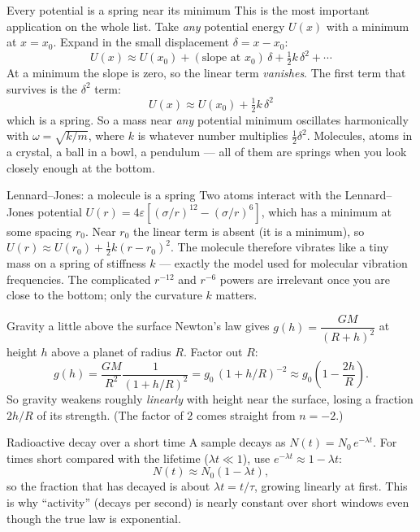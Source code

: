 \documentclass[11pt]{article}
\theoremstyle{mystyle}
\begin{document}
\begin{psidea}{Every potential is a spring near its minimum}{}
This is the most important application on the whole list. Take \emph{any} potential
energy $U(x)$ with a minimum at $x = x_0$. Expand in the small displacement
$\delta = x - x_0$:
\[
U(x) \approx U(x_0) + (\text{slope at } x_0)\,\delta + \tfrac12 k\,\delta^2 + \cdots
\]
At a minimum the slope is zero, so the linear term \emph{vanishes}. The first term that
survives is the $\delta^2$ term:
\[
\boxed{\,U(x) \approx U(x_0) + \tfrac12 k\,\delta^2\,}
\]
which is a spring. So a mass near \emph{any} potential minimum oscillates harmonically
with $\omega = \sqrt{k/m}$, where $k$ is whatever number multiplies $\tfrac12\delta^2$.
Molecules, atoms in a crystal, a ball in a bowl, a pendulum --- all of them are springs
when you look closely enough at the bottom.
\end{psidea}

\begin{psexample}{Lennard--Jones: a molecule is a spring}{}
Two atoms interact with the Lennard--Jones potential
$U(r) = 4\varepsilon\!\left[(\sigma/r)^{12} - (\sigma/r)^{6}\right]$, which has a minimum
at some spacing $r_0$. Near $r_0$ the linear term is absent (it is a minimum), so
$U(r) \approx U(r_0) + \tfrac12 k(r-r_0)^2$. The molecule therefore vibrates like a tiny
mass on a spring of stiffness $k$ --- exactly the model used for molecular vibration
frequencies. The complicated $r^{-12}$ and $r^{-6}$ powers are irrelevant once you are
close to the bottom; only the curvature $k$ matters.
\end{psexample}

\begin{psidea}{Gravity a little above the surface}{}
Newton's law gives $g(h) = \dfrac{GM}{(R+h)^2}$ at height $h$ above a planet of radius
$R$. Factor out $R$:
\[
g(h) = \frac{GM}{R^2}\frac{1}{(1+h/R)^2} = g_0\,(1 + h/R)^{-2} \approx g_0\!\left(1 - \frac{2h}{R}\right).
\]
So gravity weakens roughly \emph{linearly} with height near the surface, losing a
fraction $2h/R$ of its strength. (The factor of $2$ comes straight from $n = -2$.)
\end{psidea}

\begin{psidea}{Radioactive decay over a short time}{}
A sample decays as $N(t) = N_0\,e^{-\lambda t}$. For times short compared with the
lifetime ($\lambda t \ll 1$), use $e^{-\lambda t} \approx 1 - \lambda t$:
\[
N(t) \approx N_0(1 - \lambda t),
\]
so the fraction that has decayed is about $\lambda t = t/\tau$, growing linearly at
first. This is why ``activity'' (decays per second) is nearly constant over short
windows even though the true law is exponential.
\end{psidea}
\end{document}
